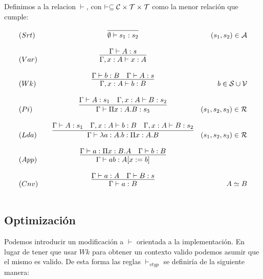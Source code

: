 \begin{definition}
Definimos a la relacion $\vdash$, con $\vdash \subseteq \mathcal{C}\times\mathcal{T}\times\mathcal{T}$ como
la menor relación que cumple:


\[
\begin{array}{llcr}
	(Srt) & &\infer{\emptyset \vdash s_{1} : s_{2}}{} & (s_{1},s_{2}) \in\cA \\ \\
	(Var) & &\infer{\Gamma, x:A \vdash x:A}{\Gamma\vdash A:s} & \\ \\
	(Wk)  & &\infer{\Gamma, x:A \vdash b:B}{\Gamma\vdash b:B & \Gamma\vdash A:s} & b\in\cS\cup\cV \\ \\
	(Pi)  & &\infer{\Gamma \vdash \Pi x:A.B : s_{3}}{\Gamma\vdash A:s_{1} & \Gamma, x:A \vdash B:s_{2}} &  (s_1,s_2,s_3)\in\cR\\ \\
	(Lda) & &\infer{\Gamma \vdash \lambda a:A.b : \Pi x:A.B }{\Gamma\vdash A:s_{1} & \Gamma, x:A \vdash b:B &\Gamma, x:A \vdash B:s_{2}} &  (s_1,s_2,s_3)\in\cR\\ \\
	(App) & &\infer{\Gamma \vdash a b : A[x:= b] }{\Gamma\vdash a : \Pi x:B.A & \Gamma \vdash b:B} &  \\ \\
	(Cnv) & &\infer{\Gamma \vdash a:B}{\Gamma\vdash a:A & \Gamma\vdash B:s} & A \simeq B \\ \\
	
\end{array}
\]

\end{definition}

\subsection{Optimización}

Podemos introducir un modificación a $\vdash$ orientada a la implementación. En lugar de tener que usar $Wk$ para
obtener un contexto valido podemos asumir que el mismo es valido. De esta forma las reglas $\vdash_{vtyp}$ se definiría de la 
siguiente manera:


